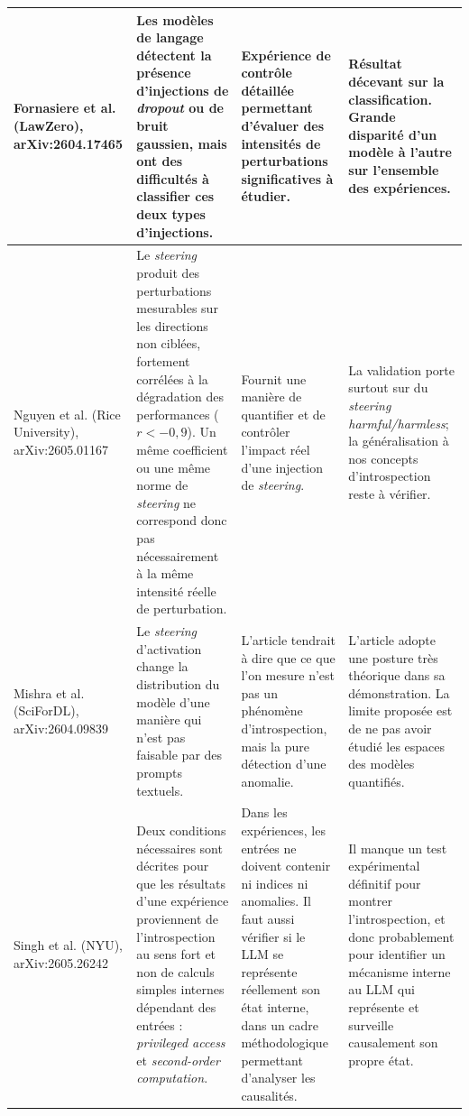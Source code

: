 \documentclass[10pt,a4paper]{article}
\begin{document}
\begin{landscape}
\begin{longtable}{@{}L{4.5cm} L{7.2cm} L{6.3cm} L{6.3cm}@{}}
Fornasiere et al. \cite{fornasiere2026}
  \newline (LawZero), arXiv:2604.17465
& Les modèles de langage détectent la présence d'injections de \emph{dropout} ou de bruit gaussien, mais ont des difficultés à classifier ces deux types d'injections.
& Expérience de contrôle détaillée permettant d'évaluer des intensités de perturbations significatives à étudier.
& Résultat décevant sur la classification. Grande disparité d'un modèle à l'autre sur l'ensemble des expériences.
\\
\midrule

Nguyen et al. \cite{nguyen2026}
  \newline (Rice University), arXiv:2605.01167
& Le \emph{steering} produit des perturbations mesurables sur les directions non ciblées, fortement corrélées à la dégradation des performances ($r < -0{,}9$). Un même coefficient ou une même norme de \emph{steering} ne correspond donc pas nécessairement à la même intensité réelle de perturbation.
& Fournit une manière de quantifier et de contrôler l'impact réel d'une injection de \emph{steering}.
& La validation porte surtout sur du \emph{steering} \emph{harmful/harmless}; la généralisation à nos concepts d'introspection reste à vérifier.
\\
\midrule

Mishra et al. \cite{mishra2026}
  \newline (SciForDL), arXiv:2604.09839
& Le \emph{steering} d'activation change la distribution du modèle d'une manière qui n'est pas faisable par des prompts textuels.
& L'article tendrait à dire que ce que l'on mesure n'est pas un phénomène d'introspection, mais la pure détection d'une anomalie.
& L'article adopte une posture très théorique dans sa démonstration. La limite proposée est de ne pas avoir étudié les espaces des modèles quantifiés.
\\
\midrule

Singh et al. \cite{singh2026}
  \newline (NYU), arXiv:2605.26242
& Deux conditions nécessaires sont décrites pour que les résultats d'une expérience proviennent de l'introspection au sens fort et non de calculs simples internes dépendant des entrées : \emph{privileged access} et \emph{second-order computation}.
& Dans les expériences, les entrées ne doivent contenir ni indices ni anomalies. Il faut aussi vérifier si le LLM se représente réellement son état interne, dans un cadre méthodologique permettant d'analyser les causalités.
& Il manque un test expérimental définitif pour montrer l'introspection, et donc probablement pour identifier un mécanisme interne au LLM qui représente et surveille causalement son propre état.
\\
\midrule


\end{longtable}
\end{landscape}
\end{document}

